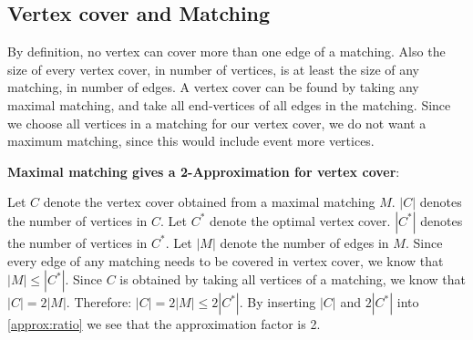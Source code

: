 \documentclass[a4paper]{article}
\begin{document}
	\subsection{Vertex cover and Matching}
	By definition, no vertex can cover more than one edge of a matching. Also the size of every vertex cover, in number of vertices, is at least the size of any matching, in number of edges. A vertex cover can be found by taking any maximal matching, and take all end-vertices of all edges in the matching. Since we choose all vertices in a matching for our vertex cover, we do not want a maximum matching, since this would include event more vertices.

	\noindent\textbf{Maximal matching gives a 2-Approximation for vertex cover}:
	
	\noindent Let $C$ denote the vertex cover obtained from a maximal matching $M$. $|C|$ denotes the number of vertices in $C$. Let $C^*$ denote the optimal vertex cover. $|C^*|$ denotes the number of vertices in $C^*$. Let $|M|$ denote the number of edges in $M$. Since every edge of any matching needs to be covered in vertex cover, we know that $|M|\leq|C^*|$. Since $C$ is obtained by taking all vertices of a matching, we know that $|C| = 2|M|$. Therefore: $|C| = 2|M| \leq 2|C^*|$. By inserting $|C|$ and $2|C^*|$ into \autoref{approx:ratio} we see that the approximation factor is 2.
	
\end{document}
